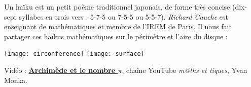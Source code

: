 \begin{debat}[Haïku]
   Un haïku est un petit poème traditionnel japonais, de forme très concise (dix-sept syllabes en trois vers : 5-7-5 ou 7-5-5 ou 5-5-7). {\it Richard Cauche} est enseignant de mathématiques et membre de l’IREM de Paris. Il nous fait partager ces haïkus mathématiques sur le périmètre et l'aire du disque :
   \begin{center}
      \texttt{[image: circonference]}
      \hspace{10mm}
      \texttt{[image: surface]}
   \end{center}
   \begin{cadre}[B2][J4]
      \begin{center}
         Vidéo : \href{https://www.yout-ube.com/watch?v=TcNfC8b4hUg}{\bf Archimède et le nombre $\pi$}, chaîne YouTube {\it m@ths et tiques}, Yvan Monka.
      \end{center}
   \end{cadre}
\end{debat}



\activites


